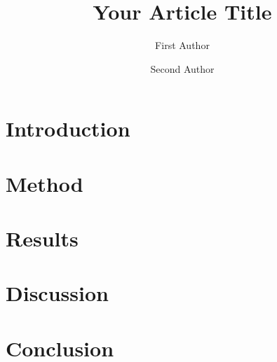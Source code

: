 \documentclass[jou]{apa7} %
\title{Your Article Title}
\author{First Author}
\affiliation{University Name}
\author{Second Author}
\affiliation{Another Institution}
\begin{document}
\maketitle

\section{Introduction}
\lipsum[1]

\section{Method}
\lipsum[2]

\section{Results}
\lipsum[3]

\section{Discussion}
\lipsum[4]

\section{Conclusion}
\lipsum[5]

\printbibliography %
\end{document}
